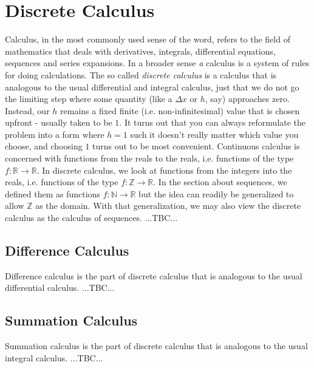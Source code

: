 \chapter{Discrete Calculus}
Calculus, in the most commonly used sense of the word, refers to the field of mathematics that deals with derivatives, integrals, differential equations, sequences and series expansions. In a broader sense \emph{a} calculus is a system of rules for doing calculations. The so called \emph{discrete calculus} is a calculus that is analogous to the usual differential and integral calculus, just that we do not go the limiting step where some quantity (like a $\Delta x$ or $h$, say) approaches zero. Instead, our $h$ remains a fixed finite (i.e. non-infinitesimal) value that is chosen upfront - usually taken to be $1$. It turns out that you can always reformulate the problem into a form where $h = 1$ such it doesn't really matter which value you choose, and choosing $1$ turns out to be most convenient. Continuous calculus is concerned with functions from the reals to the reals, i.e. functions of the type $f: \mathbb{R} \rightarrow \mathbb{R}$. In discrete calculus, we look at functions from the integers into the reals, i.e. functions of the type $f: \mathbb{Z} \rightarrow \mathbb{R}$. In the section about sequences, we defined them as functions $f: \mathbb{N} \rightarrow \mathbb{R}$ but the idea can readily be generalized to allow $\mathbb{Z}$ as the domain. With that generalization, we may also view the discrete calculus as the calculus of sequences. ...TBC...




\section{Difference Calculus}
Difference calculus is the part of discrete calculus that is analogous to the usual differential calculus. ...TBC...


\section{Summation Calculus}
Summation calculus is the part of discrete calculus that is analogous to the usual integral calculus. ...TBC...


